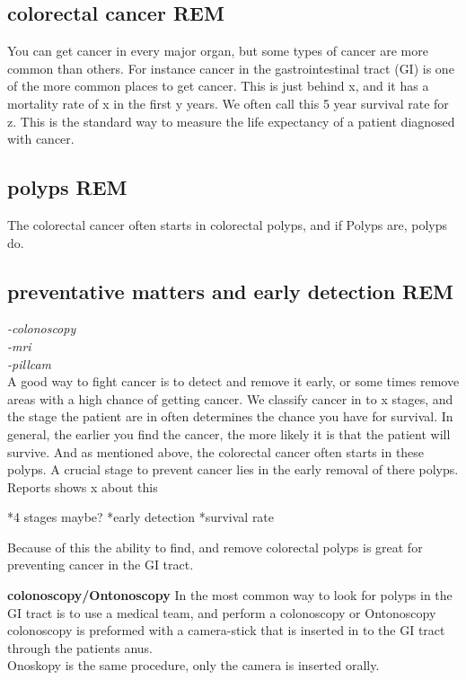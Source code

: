   \subsection{colorectal cancer REM}
    You can get cancer in every major organ, but some types of cancer are more common than others.	
    For instance cancer in the gastrointestinal tract (GI) is one of the more common places 
    to get cancer. This is just behind x, and it has a mortality rate of x in the first y years. %
    We often call this 5 year survival rate for z. This is the standard way to measure the life expectancy of a patient diagnosed with cancer. 
	
    \vspace{10px}

  \subsection{polyps REM}
    The colorectal cancer often starts in colorectal polyps, and if 
    Polyps are, polyps do.\\
	
    \vspace{10px}
	
  \subsection{preventative matters and early detection REM}
    \textit{-colonoscopy\\ 
		-mri\\
		-pillcam\\}
    A good way to fight cancer is to detect and remove it early, or some times remove areas with a high chance of getting cancer.
    We classify cancer in to x stages, and the stage the patient are in often determines the chance you have for survival. 
    In general, the earlier you find the cancer, the more likely it is that the patient will survive. 
    And as mentioned above, the colorectal cancer often starts in these polyps. A crucial stage to prevent cancer lies in the 
    early removal of there polyps.
    Reports shows x about this %
	
    *4 stages maybe?
    *early detection
    *survival rate
	
		
    Because of this the ability to find, and remove colorectal polyps is great for preventing cancer in the GI tract. 
	
	
    \vspace{10px}
	\textbf{colonoscopy/Ontonoscopy}
	In the most common way to look for polyps in the GI tract is to use a medical team, and perform a colonoscopy or Ontonoscopy
	colonoscopy is preformed with a camera-stick that is inserted in to the GI tract through the patients anus.\\
	Onoskopy is the same procedure, only the camera is inserted orally. \\
	
